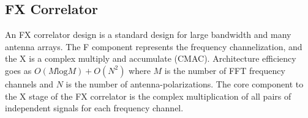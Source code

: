 \documentclass[useAMS,macros,usenatbib]{mn2e}
\begin{document}


\subsection{FX Correlator}
\label{correlator}

An FX correlator design is a standard design for large bandwidth and many antenna arrays.
The F component represents the frequency channelization, and the X is a complex multiply and accumulate (CMAC).
Architecture efficiency goes as $O( M \textrm{log} M) + O( N^2)$ where $M$ is the number of FFT frequency channels and $N$ is the number of antenna-polarizations.
The core component to the X stage of the FX correlator is the complex multiplication of all pairs of independent signals for each frequency channel.
\end{document}
